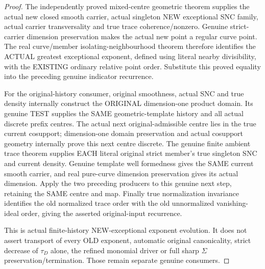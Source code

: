 \begin{proof}
The independently proved mixed-centre geometric theorem supplies the actual
new closed smooth carrier, actual singleton NEW exceptional SNC family,
actual carrier transversality and true trace coherence/nonzero. Genuine
strict-carrier dimension preservation makes the actual new point a regular
curve point. The real curve/member isolating-neighbourhood theorem therefore
identifies the ACTUAL greatest exceptional exponent, defined using literal
nearby divisibility, with the EXISTING ordinary relative point order.
Substitute this proved equality into the preceding genuine indicator
recurrence.

For the original-history consumer, original smoothness, actual SNC and
true density internally construct the ORIGINAL dimension-one product
domain. Its genuine TEST supplies the SAME geometric-template history and
all actual discrete prefix centres. The actual next original-admissible
centre lies in the true current cosupport; dimension-one domain preservation
and actual cosupport geometry internally prove this next centre discrete.
The genuine finite ambient trace theorem supplies EACH literal original
strict member's true singleton SNC and current density. Genuine template
well formedness gives the SAME current smooth carrier, and real pure-curve
dimension preservation gives its actual dimension. Apply the two preceding
producers to this genuine next step, retaining the SAME centre and map.
Finally true normalization invariance identifies the old normalized trace
order with the old unnormalized vanishing-ideal order, giving the asserted
original-input recurrence.

This is actual finite-history NEW-exceptional exponent evolution. It does
not assert transport of every OLD exponent, automatic original canonicality,
strict decrease of $\tau_D$ alone, the refined monomial driver or full sharp
$\Sigma$ preservation/termination. Those remain separate genuine consumers.
\end{proof}
